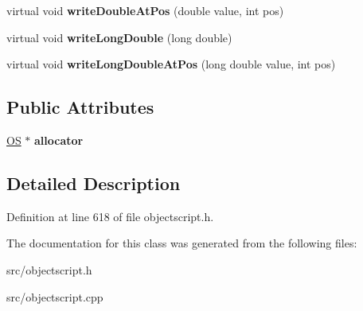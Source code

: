 \begin{DoxyCompactItemize}
\item 
virtual void {\bfseries write\+Double\+At\+Pos} (double value, int pos)\hypertarget{class_object_script_1_1_o_s_1_1_core_1_1_stream_writer_a86677c2bf06f7b9ea4b05b937277752e}{}\label{class_object_script_1_1_o_s_1_1_core_1_1_stream_writer_a86677c2bf06f7b9ea4b05b937277752e}

\item 
virtual void {\bfseries write\+Long\+Double} (long double)\hypertarget{class_object_script_1_1_o_s_1_1_core_1_1_stream_writer_a13eedcbc59fa503be80068758f06a005}{}\label{class_object_script_1_1_o_s_1_1_core_1_1_stream_writer_a13eedcbc59fa503be80068758f06a005}

\item 
virtual void {\bfseries write\+Long\+Double\+At\+Pos} (long double value, int pos)\hypertarget{class_object_script_1_1_o_s_1_1_core_1_1_stream_writer_a2698b85171fd8c7299f3facd6928a53a}{}\label{class_object_script_1_1_o_s_1_1_core_1_1_stream_writer_a2698b85171fd8c7299f3facd6928a53a}

\end{DoxyCompactItemize}
\subsection*{Public Attributes}
\begin{DoxyCompactItemize}
\item 
\hyperlink{class_object_script_1_1_o_s}{OS} $\ast$ {\bfseries allocator}\hypertarget{class_object_script_1_1_o_s_1_1_core_1_1_stream_writer_a254ee75132d8b931932c8d7bec9dc059}{}\label{class_object_script_1_1_o_s_1_1_core_1_1_stream_writer_a254ee75132d8b931932c8d7bec9dc059}

\end{DoxyCompactItemize}


\subsection{Detailed Description}


Definition at line 618 of file objectscript.\+h.



The documentation for this class was generated from the following files\+:\begin{DoxyCompactItemize}
\item 
src/objectscript.\+h\item 
src/objectscript.\+cpp\end{DoxyCompactItemize}

